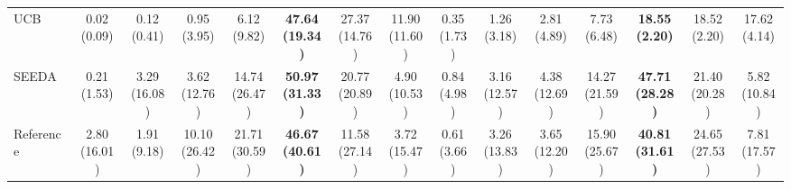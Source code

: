{\begin{tabular}{l|ccccccc|ccccccc}
UCB & \makecell{0.02 \\ (0.09)} & \makecell{0.12 \\ (0.41)} & \makecell{0.95 \\ (3.95)} & \makecell{6.12 \\ (9.82)} & \cellcolor[HTML]{C8E6C9}\bfseries \makecell{47.64 \\ (19.34)} & \makecell{27.37 \\ (14.76)} & \makecell{11.90 \\ (11.60)} & \makecell{0.35 \\ (1.73)} & \makecell{1.26 \\ (3.18)} & \makecell{2.81 \\ (4.89)} & \makecell{7.73 \\ (6.48)} & \cellcolor[HTML]{C8E6C9}\bfseries \makecell{18.55 \\ (2.20)} & \makecell{18.52 \\ (2.20)} & \makecell{17.62 \\ (4.14)} \\
SEEDA & \makecell{0.21 \\ (1.53)} & \makecell{3.29 \\ (16.08)} & \makecell{3.62 \\ (12.76)} & \makecell{14.74 \\ (26.47)} & \cellcolor[HTML]{C8E6C9}\bfseries \makecell{50.97 \\ (31.33)} & \makecell{20.77 \\ (20.89)} & \makecell{4.90 \\ (10.53)} & \makecell{0.84 \\ (4.98)} & \makecell{3.16 \\ (12.57)} & \makecell{4.38 \\ (12.69)} & \makecell{14.27 \\ (21.59)} & \cellcolor[HTML]{C8E6C9}\bfseries \makecell{47.71 \\ (28.28)} & \makecell{21.40 \\ (20.28)} & \makecell{5.82 \\ (10.84)} \\
Reference & \makecell{2.80 \\ (16.01)} & \makecell{1.91 \\ (9.18)} & \makecell{10.10 \\ (26.42)} & \makecell{21.71 \\ (30.59)} & \cellcolor[HTML]{C8E6C9}\bfseries \makecell{46.67 \\ (40.61)} & \makecell{11.58 \\ (27.14)} & \makecell{3.72 \\ (15.47)} & \makecell{0.61 \\ (3.66)} & \makecell{3.26 \\ (13.83)} & \makecell{3.65 \\ (12.20)} & \makecell{15.90 \\ (25.67)} & \cellcolor[HTML]{C8E6C9}\bfseries \makecell{40.81 \\ (31.61)} & \makecell{24.65 \\ (27.53)} & \makecell{7.81 \\ (17.57)} \\

\end{tabular}}

